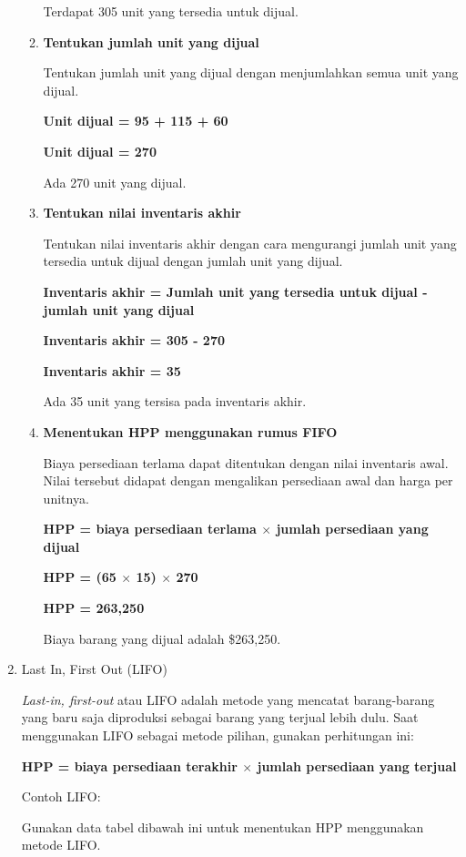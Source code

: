 \begin{enumerate}
\begin{enumerate}
		Terdapat 305 unit yang tersedia untuk dijual.

		\item \textbf{Tentukan jumlah unit yang dijual}
		
		Tentukan jumlah unit yang dijual dengan menjumlahkan semua unit yang dijual.

		\textbf{Unit dijual = 95 + 115 + 60}

		\textbf{Unit dijual = 270}

		Ada 270 unit yang dijual.

		\item \textbf{Tentukan nilai inventaris akhir}
		
		Tentukan nilai inventaris akhir dengan cara mengurangi jumlah unit yang tersedia untuk dijual dengan jumlah unit yang dijual.

		\textbf{Inventaris akhir = Jumlah unit yang tersedia untuk dijual - jumlah unit yang dijual}

		\textbf{Inventaris akhir = 305 - 270}

		\textbf{Inventaris akhir = 35}

		Ada 35 unit yang tersisa pada inventaris akhir.

		\item \textbf{Menentukan HPP menggunakan rumus FIFO}
		
		Biaya persediaan terlama dapat ditentukan dengan nilai inventaris awal. Nilai tersebut didapat dengan mengalikan persediaan awal dan harga per unitnya. 

		\textbf{HPP = biaya persediaan terlama $\times$ jumlah persediaan yang dijual}

		\textbf{HPP = (65 $\times$ 15) $\times$ 270}

		\textbf{HPP = 263,250}

		Biaya barang yang dijual adalah \${263,250}.

	  \end{enumerate}

	\item Last In, First Out (LIFO)
	
	\textit{Last-in, first-out} atau LIFO adalah metode yang mencatat barang-barang yang baru saja diproduksi sebagai barang yang terjual lebih dulu. Saat menggunakan LIFO sebagai metode pilihan, gunakan perhitungan ini:

	\textbf{HPP = biaya persediaan terakhir $\times$ jumlah persediaan yang terjual}

	Contoh LIFO:

	Gunakan data tabel dibawah ini untuk menentukan HPP menggunakan metode LIFO.


\end{enumerate}
